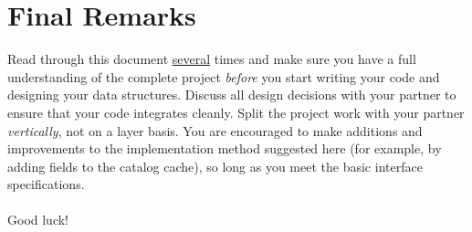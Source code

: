 \section{Final Remarks}
Read through this document \underline{several} times and make sure
you have a full understanding of the complete project \emph{before}
you start writing your code and designing your data structures.
Discuss all design decisions with your partner to ensure that your
code integrates cleanly.  Split the project work with your partner
\emph{vertically}, not on a layer basis.  You are encouraged to make
additions and improvements to the implementation method suggested
here (for example, by adding fields to the catalog cache), so long
as you meet the basic interface specifications.
\\
\\
Good luck!






                       






